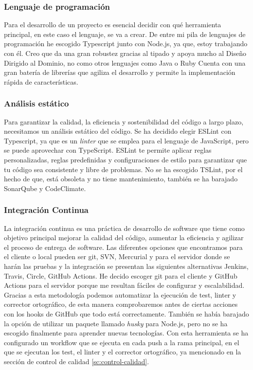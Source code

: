 \subsubsection*{Lenguaje de programación}
Para el desarrollo de un proyecto es esencial decidir con qué herramienta principal, en este caso el lenguaje, se va a crear. De entre mi pila de lenguajes de programación he
escogido Typescript junto con Node.js, ya que, estoy trabajando con él. Creo que da una gran robustez gracias al tipado y apoya mucho al Diseño Dirigido al Dominio, no como otros lenguajes como Java o Ruby
Cuenta con una gran batería de librerías que agiliza el desarrollo y permite la implementación rápida de características.

\subsubsection*{Análisis estático}
Para garantizar la calidad, la eficiencia y sostenibilidad del código a largo plazo, necesitamos un análisis estático del código.
Se ha decidido elegir ESLint con Typescript, ya que es un \textit{linter} que se emplea para el lenguaje de JavaScript, pero se puede aprovechar con TypeScript.
ESLint te permite aplicar reglas personalizadas, reglas predefinidas y configuraciones de estilo para garantizar que tu código sea consistente y libre de problemas.
No se ha escogido TSLint, por el hecho de que, está obsoleta y no tiene mantenimiento, también se ha barajado SonarQube y CodeClimate.

\subsubsection*{Integración Continua}
La integración continua es una práctica de desarrollo de software que tiene como objetivo principal mejorar la calidad del código, aumentar la eficiencia y agilizar el proceso de entrega de software.
Las diferentes opciones que encontramos para el cliente o local pueden ser git, SVN, Mercurial y para el servidor donde se harán las pruebas y la integración se presentan las siguientes
alternativas Jenkins, Travis, Circle, GitHub Actions. He decido escoger git para el cliente y GitHub Actions para el servidor porque me resultan fáciles de configurar y escalabilidad.
Gracias a esta metodología podemos automatizar la ejecución de test, linter y corrector ortográfico, de esta manera comprobaremos antes de ciertas acciones con los hooks de GitHub que todo está
correctamente. También se había barajado la opción de utilizar un paquete llamado \textit{husky} para Node.js, pero no se ha escogido finalmente para aprender nuevas tecnologías.
Con esta herramienta se ha configurado un workflow que se ejecuta en cada push a la rama principal, en el que se ejecutan los test, el linter y el corrector ortográfico, ya mencionado en la sección de control de calidad \ref{sc:control-calidad}.

